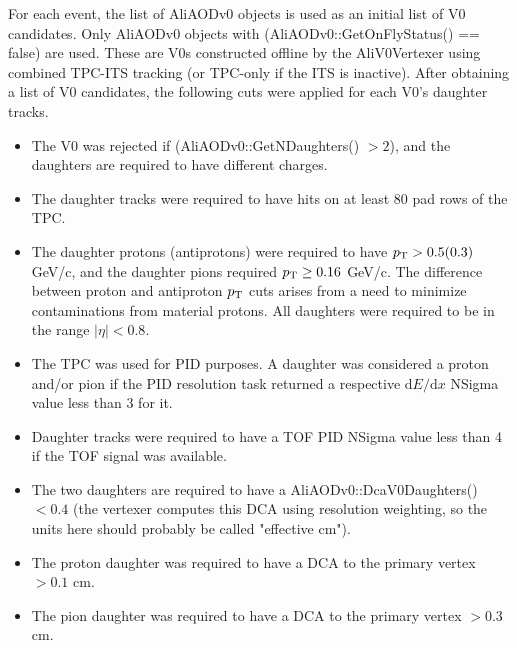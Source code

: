 For each event, the list of AliAODv0 objects is used as an initial list of V0 candidates.  
Only AliAODv0 objects with (AliAODv0::GetOnFlyStatus() == false) are used.  
These are V0s constructed offline by the AliV0Vertexer using combined TPC-ITS tracking (or TPC-only if the ITS is inactive).  
After obtaining a list of V0 candidates, the following cuts were applied for each V0's daughter tracks.

\begin{itemize}
\item The V0 was rejected if (AliAODv0::GetNDaughters() $> 2$), and the daughters are required to have different charges.
\item The daughter tracks were required to have hits on at least 80 pad rows of the TPC.
\item The daughter protons (antiprotons) were required to have $p_{\rm T} > 0.5 (0.3)$ GeV/c, and the daughter pions required $p_{\rm T} \geq 0.16$ GeV/c. 
The difference between proton and antiproton $p_{\rm T}$ cuts arises from a need to minimize contaminations from material protons. 
All daughters were required to be in the range $|\eta| < 0.8$.
\item The TPC was used for PID purposes.  
A daughter was considered a proton and/or pion if the PID resolution task returned a respective $\mathrm{d}E/\mathrm{d}x$ NSigma value less than 3 for it.
\item Daughter tracks were required to have a TOF PID NSigma value less than 4 if the TOF signal was available.
\item The two daughters are required to have a AliAODv0::DcaV0Daughters() $< 0.4$ (the vertexer computes this DCA using resolution weighting, so the units here should probably be called "effective cm").
\item The proton daughter was required to have a DCA to the primary vertex $> 0.1$ cm.
\item The pion daughter was required to have a DCA to the primary vertex $> 0.3$ cm.
\end{itemize}

